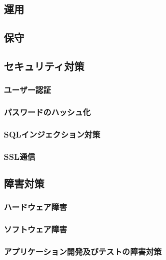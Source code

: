 \subsection{運用}

\subsection{保守}

\subsection{セキュリティ対策}

\subsubsection{ユーザー認証}

\subsubsection{パスワードのハッシュ化}

\subsubsection{SQLインジェクション対策}

\subsubsection{SSL通信}

\subsection{障害対策}

\subsubsection{ハードウェア障害}

\subsubsection{ソフトウェア障害}

\subsubsection{アプリケーション開発及びテストの障害対策}

